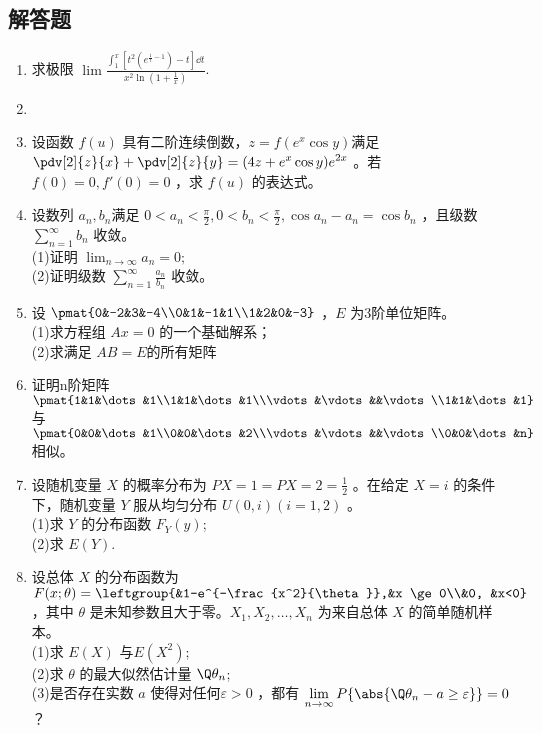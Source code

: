 \subsection{解答题}
\begin{enumerate}
\item 求极限 $\displaystyle \lim \frac{\int_{1 }^{x} [t^2(e^{\frac{1}{t}-1})-t]\dd{t}}{x^2\ln(1+\frac{1}{x})}$.
\item 
\item 设函数 $f(u)$ 具有二阶连续倒数，$z=f(e^x\cos y)$满足 $\displaystyle \pdv[2]{z}{x}+\pdv[2]{z}{y}=(4z+e^x\cos y)e^{2x}$  。若 $f(0)=0,f'(0)=0$ ，求 $f(u)$ 的表达式。
\item 设数列 ${a_n},{b_n}$满足 $\displaystyle 0<a_n<\frac{\pi}{2},0<b_n<\frac{\pi}{2},\cos a_n-a_n=\cos b_n$ ，且级数 $\displaystyle \sum_{n=1}^\infty b_n$  收敛。\\
(1)证明 $\lim_{n\to\infty} a_n=0;$\\
(2)证明级数 $\displaystyle \sum_{n=1}^\infty \frac{a_n}{b_n}$  收敛。
\item 设 $\pmat{0&-2&3&-4\\0&1&-1&1\\1&2&0&-3}$ ，$ E$  为3阶单位矩阵。\\
(1)求方程组 $Ax=0$ 的一个基础解系；\\
(2)求满足 $AB=E$的所有矩阵 
\item 证明n阶矩阵 $\pmat{1&1&\dots&1\\1&1&\dots&1\\\vdots&\vdots&&\vdots\\1&1&\dots&1}$ 与 $\pmat{0&0&\dots&1\\0&0&\dots&2\\\vdots&\vdots&&\vdots\\0&0&\dots&n}$ 相似。
\item 设随机变量 $X$ 的概率分布为 $P{X=1}=P{X=2}=\frac{1}{2}$ 。在给定 $X=i$ 的条件下，随机变量 $Y$ 服从均匀分布 $U(0,i)(i=1,2)$ 。\\
(1)求 $Y$ 的分布函数 $F_Y(y)$;\\
(2)求 $E(Y)$.
\item 设总体 $X$ 的分布函数为 $\displaystyle F(x;\theta)=\leftgroup{&1-e^{-\frac{x^2}{\theta}},&x \ge 0\\&0, &x<0}$，其中 $\theta$ 是未知参数且大于零。$X_1,X_2,\dots,X_n$  为来自总体 $X$ 的简单随机样本。\\
(1)求 $E(X)$ 与$ E(X^2)$;\\
(2)求 $\theta$ 的最大似然估计量 $\Q \theta_n$;\\
(3)是否存在实数 $a$ 使得对任何$\varepsilon>0  $ ，都有 $\displaystyle \lim_{n\to\infty} P\{\abs{\Q \theta_n -a \ge \varepsilon} \}=0$？
\end{enumerate}
